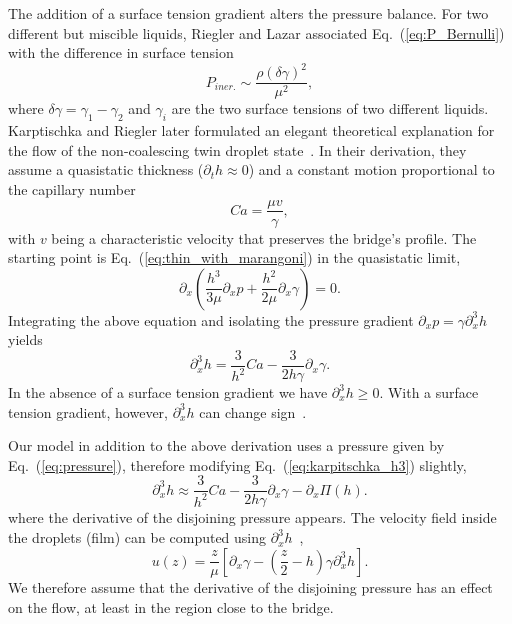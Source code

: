 \documentclass[twocolumn,amsmath,amssymb,showpacs,nofootinbib,prfluids,superscriptaddress]{revtex4-2} %
\begin{document}
The addition of a surface tension gradient alters the pressure balance.
For two different but miscible liquids, Riegler and Lazar associated Eq.~(\ref{eq:P_Bernulli}) with the difference in surface tension~\cite{doi:10.1021/la800630w}
\begin{equation}\label{eq:P_bernulli_riegler}
    P_{iner.} \sim \frac{\rho (\delta\gamma)^2}{\mu^2}, 
\end{equation}
where $\delta\gamma = \gamma_1 - \gamma_2$ and $\gamma_i$ are the two surface tensions of two different liquids. 
Karptischka and Riegler later formulated an elegant theoretical explanation for the flow of the non-coalescing twin droplet state~\cite{PhysRevLett.109.066103}.
In their derivation, they assume a quasistatic thickness ($\partial_t h \approx 0$) and a constant motion proportional to the capillary number 
\begin{equation}\label{eq:sys_cap_vel}
    Ca = \frac{\mu v}{\gamma},
\end{equation} 
with $v$ being a characteristic velocity that preserves the bridge's profile. 
The starting point is Eq.~(\ref{eq:thin_with_marangoni}) in the quasistatic limit, 
\begin{equation}\label{eq:pressure_noncoal}
    \partial_x\left(\frac{h^3}{3\mu}\partial_x p + \frac{h^2}{2\mu}\partial_x\gamma\right) = 0.
\end{equation}
Integrating the above equation and isolating the pressure gradient $\partial_x p = \gamma\partial_x^3 h$ yields~\cite{RevModPhys.69.931, PhysRevLett.109.066103}
\begin{equation}\label{eq:karpitschka_h3}
    \partial_x^3 h = \frac{3}{h^2}Ca - \frac{3}{2h\gamma}\partial_x\gamma.
\end{equation}
In the absence of a surface tension gradient we have $\partial_x^3 h \geq 0$.
With a surface tension gradient, however, $\partial_x^3 h$ can change sign~\cite{PhysRevLett.109.066103}.

Our model in addition to the above derivation uses a pressure given by Eq.~(\ref{eq:pressure}), therefore modifying Eq.~(\ref{eq:karpitschka_h3}) slightly, 
\begin{equation}\label{eq:stefan_h3}
    \partial_x^3 h \approx \frac{3}{h^2}Ca - \frac{3}{2h\gamma}\partial_x\gamma - \partial_x\Pi(h).
\end{equation}
where the derivative of the disjoining pressure appears. 
The velocity field inside the droplets (film) can be computed using $\partial_x^3 h$~\cite{RevModPhys.69.931},
\begin{equation}\label{eq:Oron_correct}
    u(z) = \frac{z}{\mu}\left[\partial_x\gamma - \left(\frac{z}{2} - h\right)\gamma\partial_x^3 h\right].
\end{equation}
We therefore assume that the derivative of the disjoining pressure has an effect on the flow, at least in the region close to the bridge.
\end{document}
